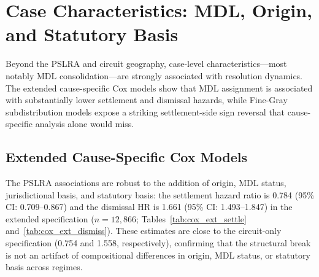 
\section{Case Characteristics: MDL, Origin, and Statutory Basis}
\label{sec:results_characteristics}

Beyond the PSLRA and circuit geography, case-level
characteristics---most notably MDL consolidation---are
strongly associated with resolution dynamics. The extended
cause-specific Cox models show that MDL assignment is
associated with substantially lower settlement and dismissal
hazards, while Fine-Gray subdistribution models expose a
striking settlement-side sign reversal that cause-specific
analysis alone would miss.

\subsection{Extended Cause-Specific Cox Models}

The PSLRA associations are robust to the addition of
origin, MDL status, jurisdictional basis, and statutory
basis: the settlement hazard ratio is 0.784 (95\% CI:
0.709--0.867) and the dismissal HR is 1.661 (95\% CI:
1.493--1.847) in the extended specification ($n = 12{,}866$;
Tables~\ref{tab:cox_ext_settle}
and~\ref{tab:cox_ext_dismiss}). These estimates are close to the
circuit-only specification (0.754 and 1.558, respectively),
confirming that the structural break is not an artifact of
compositional differences in origin, MDL status, or statutory
basis across regimes.

